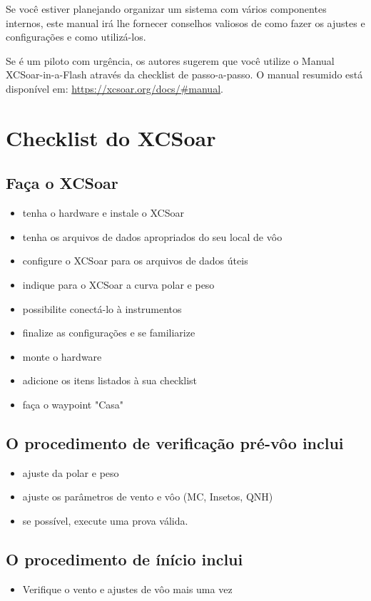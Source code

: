 Se você estiver planejando organizar um sistema com vários componentes internos, este manual irá lhe fornecer conselhos valiosos de como fazer os ajustes e configurações e como utilizá-los.

Se é um piloto com urgência, os autores sugerem que você utilize o Manual XCSoar-in-a-Flash através da checklist de passo-a-passo.  O manual resumido está disponível em: 
 \url{https://xcsoar.org/docs/#manual}.



\section{Checklist do XCSoar}

\subsection*{Faça o XCSoar}
\begin{itemize}
\item tenha o hardware e instale o XCSoar
\item tenha os arquivos de dados apropriados do seu local de vôo
\item configure o XCSoar para os arquivos de dados úteis
\item indique para o XCSoar a curva polar e peso
\item possibilite conectá-lo à instrumentos
\item finalize as configurações e se familiarize
\item monte o hardware
\item adicione os itens listados à sua checklist
\item faça o waypoint "Casa"
\end{itemize}

\subsection*{O procedimento de verificação pré-vôo inclui}
\begin{itemize}
\item ajuste da polar e peso
\item ajuste os parâmetros de vento e vôo (MC, Insetos, QNH)
\item se possível, execute uma prova válida.
\end{itemize}

\subsection*{O procedimento de ínício inclui}
\begin{itemize}
\item Verifique o vento e ajustes de vôo mais uma vez
\end{itemize}
\vspace{2em}

